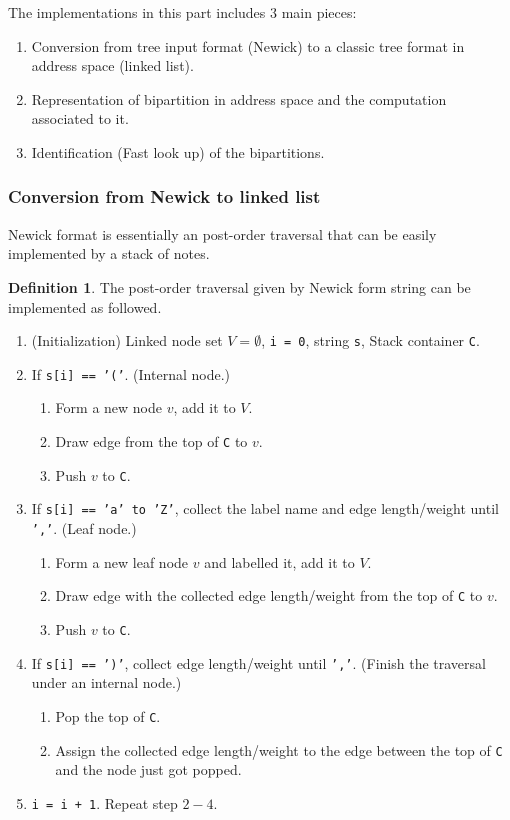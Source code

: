 \documentclass[11pt]{article}
\theoremstyle{definition}
\newtheorem{defn}{Definition}[section]
\theoremstyle{remark}
\theoremstyle{plain}
\begin{document}
The implementations in this part includes $3$ main pieces: 
\begin{enumerate}
	\item Conversion from tree input format (Newick) to a classic tree format in address space (linked list).
	\item Representation of bipartition in address space and the computation associated to it.
	\item Identification (Fast look up) of the bipartitions.
\end{enumerate}

\subsubsection{Conversion from Newick to linked list}

Newick format is essentially an post-order traversal that can be easily implemented by a stack of notes.
\begin{defn}
	The post-order traversal given by Newick form string can be implemented as followed.
	\begin{enumerate}
		\item (Initialization) Linked node set $V = \emptyset$, \texttt{i = 0}, string \texttt{s}, Stack container \texttt{C}. 
		\item If \texttt{s[i] == '('}. (Internal node.)
		\begin{enumerate}
			\item Form a new node $v$, add it to $V$. 
			\item Draw edge from the top of \texttt{C} to $v$. 
			\item Push $v$ to \texttt{C}. 
		\end{enumerate}
		\item If \texttt{s[i] == 'a' to 'Z'}, collect the label name and edge length/weight until \texttt{','}. (Leaf node.)
		\begin{enumerate}
			\item Form a new leaf node $v$ and labelled it, add it to $V$. 
			\item Draw edge with the collected edge length/weight from the top of \texttt{C} to $v$. 
			\item Push $v$ to \texttt{C}. 
		\end{enumerate}
		\item If \texttt{s[i] == ')'}, collect edge length/weight until \texttt{','}. (Finish the traversal under an internal node.)
		\begin{enumerate}
			\item Pop the top of \texttt{C}.
			\item Assign the collected edge length/weight to the edge between the top of \texttt{C} and the node just got popped.
		\end{enumerate}
		\item \texttt{i = i + 1}. Repeat step $2-4$.
	\end{enumerate}
\end{defn}
\end{document}
